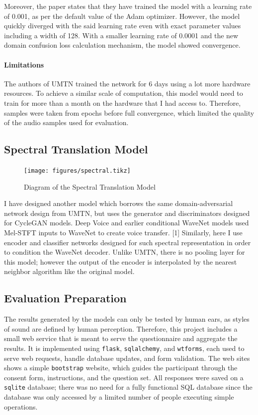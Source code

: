 \documentclass[12pt,a4paper,]{report}
\begin{document}
Moreover, the paper states that they have trained the model with a
learning rate of 0.001, as per the default value of the Adam optimizer.
However, the model quickly diverged with the said learning rate even
with exact parameter values including a width of 128. With a smaller
learning rate of 0.0001 and the new domain confusion loss calculation
mechanism, the model showed convergence.

\paragraph{Limitations \label{limitations}}

The authors of UMTN trained the network for 6 days using a lot more
hardware resources. To achieve a similar scale of computation, this
model would need to train for more than a month on the hardware that I
had access to. Therefore, samples were taken from epochs before full
convergence, which limited the quality of the audio samples used for
evaluation.

\hypertarget{spectral-translation-model}{%
\subsection{Spectral Translation
Model}\label{spectral-translation-model}}

\begin{figure}
    \texttt{[image: figures/spectral.tikz]}
    \centering
    \caption{Diagram of the Spectral Translation Model}
\end{figure}

I have designed another model which borrows the same domain-adversarial
network design from UMTN, but uses the generator and discriminators
designed for CycleGAN models. Deep Voice and earlier conditional WaveNet
models used Mel-STFT inputs to WaveNet to create voice transfer. {[}1{]}
Similarly, here I use encoder and classifier networks designed for such
spectral representation in order to condition the WaveNet decoder.
Unlike UMTN, there is no pooling layer for this model; however the
output of the encoder is interpolated by the nearest neighbor algorithm
like the original model.

\hypertarget{evaluation-preparation}{%
\subsection{Evaluation Preparation}\label{evaluation-preparation}}

The results generated by the models can only be tested by human ears, as
styles of sound are defined by human perception. Therefore, this project
includes a small web service that is meant to serve the questionnaire
and aggregate the results. It is implemented using \texttt{flask},
\texttt{sqlalchemy}, and \texttt{wtforms}, each used to serve web
requests, handle database updates, and form validation. The web sites
shows a simple \texttt{bootstrap} website, which guides the participant
through the consent form, instructions, and the question set. All
responses were saved on a \texttt{sqlite} database; there was no need
for a fully functional SQL database since the database was only accessed
by a limited number of people executing simple operations.
\end{document}
